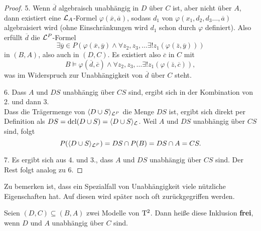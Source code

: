 \begin{proof}
	\item[5.] Wenn $\overline{d}$ algebraisch unabhängig in $D$ über $C$ ist, aber nicht über $A$, dann existiert eine $\mathcal{L}_A$-Formel $\varphi(\overline{x},\overline{a})$, sodass $d_1$ von $\varphi(x_1,d_2,d_3\dots,\overline{a})$ algebraisiert wird (ohne Einschränkungen wird $d_1$ schon durch $\varphi$ definiert). Also erfüllt $\overline{d}$ die $\mathcal{L}^P$-Formel $$\exists \overline{y}\in P(\varphi(\overline{x},\overline{y})\land\forall z_2,z_3,\dots\exists! z_1(\varphi(\overline{z},\overline{y})))$$ in $(B,A)$, also auch in $(D,C)$. Es existiert also $\overline{c}$ in $C$ mit $$B\models\varphi(\overline{d},\overline{c})\land\forall z_2,z_3,\dots\exists! z_1(\varphi(\overline{z},\overline{c})),$$ was im Widerspruch zur Unabhängigkeit von $\overline{d}$ über $C$ steht.
	\item[6.] Dass $A$ und $DS$ unabhängig über $CS$ sind, ergibt sich in der Kombination von 2. und dann 3.\\
	Dass die Trägermenge von $\langle D\cup S\rangle_{\mathcal{L}^P}$ die Menge $DS$ ist, ergibt sich direkt per Definition als $DS=\operatorname{dcl}(D\cup S)=\langle D\cup S\rangle_{\mathcal{L}}$. Weil $A$ und $DS$ unabhängig über $CS$ sind, folgt $$P(\langle D\cup S\rangle_{\mathcal{L}^P})=DS\cap P(B)=DS\cap A=CS.$$
	\item[7.] Es ergibt sich aus 4. und 3., dass $A$ und $DS$ unabhängig über $CS$ sind. Der Rest folgt analog zu 6.
\end{proof}

Zu bemerken ist, dass ein Spezialfall von Unabhängigkeit viele nützliche Eigenschaften hat. Auf diesen wird später noch oft zurückgegriffen werden.
\begin{definition}
	Seien $(D,C)\subseteq(B,A)$ zwei Modelle von $\operatorname{T^2}$. Dann heiße diese Inklusion \textbf{frei}, wenn $D$ und $A$ unabhängig über $C$ sind.
\end{definition}

